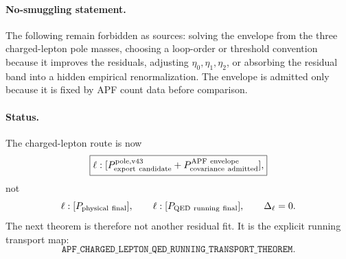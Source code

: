 \paragraph{No-smuggling statement.}
The following remain forbidden as sources: solving the envelope from the three charged-lepton pole masses, choosing a loop-order or threshold convention because it improves the residuals, adjusting $\eta_0,\eta_1,\eta_2$, or absorbing the residual band into a hidden empirical renormalization.  The envelope is admitted only because it is fixed by APF count data before comparison.

\paragraph{Status.}
The charged-lepton route is now
\[
\boxed{
\ell:[P_{\rm export\ candidate}^{\rm pole,v43}+P_{\rm covariance\ admitted}^{\rm APF\ envelope}],
}
\]
not
\[
\ell:[P_{\rm physical\ final}],\qquad
\ell:[P_{\rm QED\ running\ final}],\qquad
\Delta_\ell=0.
\]
The next theorem is therefore not another residual fit.  It is the explicit running transport map:
\[
\boxed{\texttt{APF\_CHARGED\_LEPTON\_QED\_RUNNING\_TRANSPORT\_THEOREM}.}
\]
